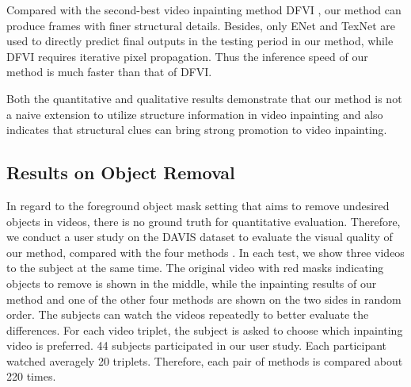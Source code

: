 Compared with the second-best video inpainting method DFVI \cite{Xu_2019_CVPR}, our method can produce frames with finer structural details. Besides, only ENet and TexNet are used to directly predict final outputs in the testing period in our method, while DFVI requires iterative pixel propagation. Thus the inference speed of our method is much faster than that of DFVI.
%

Both the quantitative and qualitative results demonstrate that our method is not a naive extension to utilize structure information in video inpainting and also indicates that structural clues can bring strong promotion to video inpainting.



%




\subsection{Results on Object Removal}


In regard to the foreground object mask setting that aims to remove undesired objects in videos, there is no ground truth for quantitative evaluation. Therefore,
we conduct a user study on the DAVIS dataset to evaluate the visual quality of our method, compared with the four methods \cite{nazeri2019edgeconnect,wang2019video,Kim_2019_CVPR1,Xu_2019_CVPR}.
%
In each test, we show three videos to the subject at the same time. The original video with red masks indicating objects to remove is shown in the middle, while the inpainting results of our method and one of the other four methods are shown on the two sides in random order.
%  
The subjects can watch the videos repeatedly to better evaluate the differences.
For each video triplet, the subject is asked to choose which inpainting video is preferred.
44 subjects participated in our user study. 
Each participant watched averagely 20 triplets. 
Therefore, each pair of methods is compared about 220 times.

%



